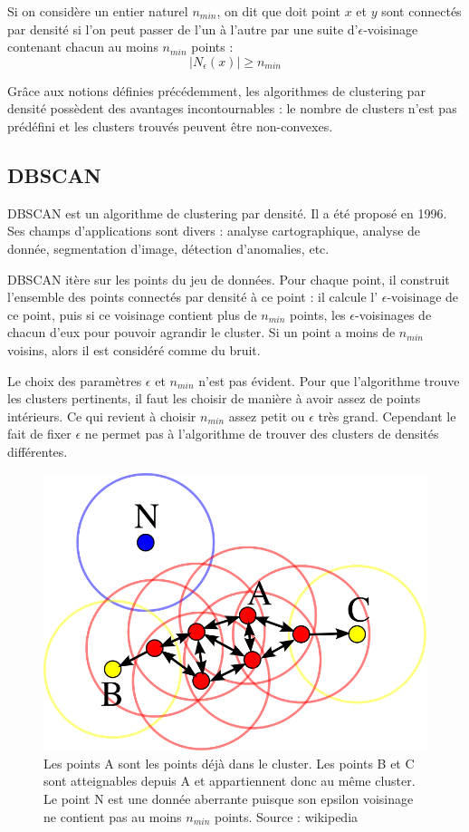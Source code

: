 \documentclass[11pt, openany]{report}
\begin{document}
Si on considère un entier naturel $n_{min}$, on dit que doit point $x$ et $y$ sont connectés par densité si l'on peut passer de l'un à l'autre par une suite d'$\epsilon$-voisinage contenant chacun au moins $n_{min}$ points :
\[ |{N_{\epsilon}}\left(x\right)| \geq n_{min}  \]

Grâce aux notions définies précédemment, les algorithmes de clustering par densité possèdent des avantages incontournables : le nombre de clusters n'est pas prédéfini et les clusters trouvés peuvent être non-convexes.

\subsection{DBSCAN}
DBSCAN est un algorithme de clustering par densité. Il a été proposé en 1996. Ses champs d'applications sont divers : analyse cartographique, analyse de donnée, segmentation d'image, détection d'anomalies, etc. \par
DBSCAN itère sur les points du jeu de données. Pour chaque point, il construit l'ensemble des points connectés par densité à ce point : il calcule l' $\epsilon$-voisinage de ce point, puis si ce  voisinage contient plus de $n_{min}$ points, les $\epsilon$-voisinages de chacun d'eux pour pouvoir agrandir le cluster. Si un point a moins de $n_{min}$ voisins, alors il est considéré comme du bruit.

Le choix des paramètres $\epsilon$ et $n_{min}$ n'est pas évident. Pour que l'algorithme trouve les clusters pertinents, il faut les choisir de manière à avoir assez de points intérieurs. Ce  qui revient à choisir $n_{min}$ assez petit ou $\epsilon$ très grand. Cependant le fait de fixer $\epsilon$ ne permet pas à l'algorithme de trouver des clusters de densités différentes. \\

\begin{figure}[H]
  \centering
  \includegraphics[width=0.6\linewidth]{dbscan.png}
  \caption{Les points A sont les points déjà dans le cluster. Les points B et C sont atteignables depuis A et appartiennent donc au même cluster. Le point N est une donnée aberrante puisque son epsilon voisinage ne contient pas au moins $n_{min}$ points. Source : wikipedia}
\end{figure}
\end{document}
